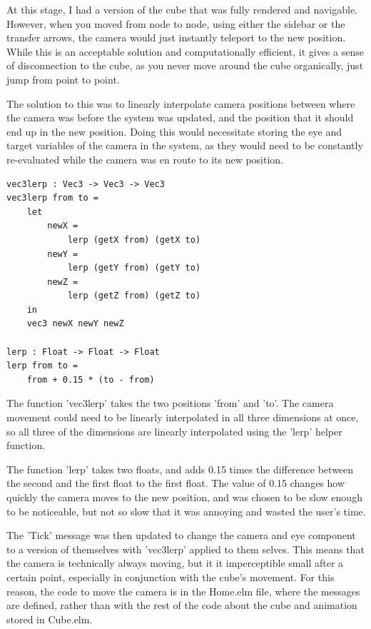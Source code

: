\documentclass{l4proj}
\begin{document}
At this stage, I had a version of the cube that was fully rendered and navigable.  However, when you moved from node to node, using either the sidebar or the transfer arrows, the camera would just instantly teleport to the new position.  While this is an acceptable solution and computationally efficient, it gives a sense of disconnection to the cube, as you never move around the cube organically, just jump from point to point.

The solution to this was to linearly interpolate camera positions between where the camera was before the system was updated, and the position that it should end up in the new position.  Doing this would necessitate storing the eye and target variables of the camera in the system, as they would need to be constantly re-evaluated while the camera was en route to its new position.

\begin{lstlisting}
vec3lerp : Vec3 -> Vec3 -> Vec3
vec3lerp from to =
    let
        newX =
            lerp (getX from) (getX to)
        newY =
            lerp (getY from) (getY to)
        newZ =
            lerp (getZ from) (getZ to)
    in
    vec3 newX newY newZ

lerp : Float -> Float -> Float
lerp from to =
    from + 0.15 * (to - from)
\end{lstlisting}

The function 'vec3lerp' takes the two positions 'from' and 'to'.  The camera movement could need to be linearly interpolated in all three dimensions at once, so all three of the dimensions are linearly interpolated using the 'lerp' helper function.

The function 'lerp' takes two floats, and adds 0.15 times the difference between the second and the first float to the first float.  The value of 0.15 changes how quickly the camera moves to the new position, and was chosen to be slow enough to be noticeable, but not so slow that it was annoying and wasted the user's time.

The 'Tick' message was then updated to change the camera and eye component to a version of themselves with 'vec3lerp' applied to them selves.  This means that the camera is technically always moving, but it it imperceptible small after a certain point, especially in conjunction with the cube's movement.  For this reason, the code to move the camera is in the Home.elm file, where the messages are defined, rather than with the rest of the code about the cube and animation stored in Cube.elm.
\end{document}
